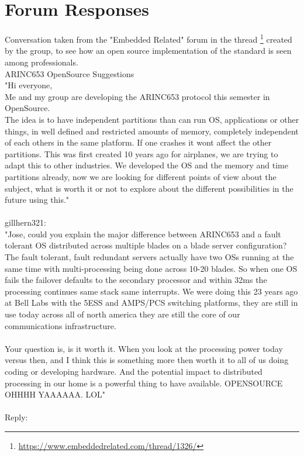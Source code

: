\chapter{Forum Responses}
\label{chap:Forum Responses}

Conversation taken from the "Embedded Related" forum in the thread
\footnote{\url{https://www.embeddedrelated.com/thread/1326/}}
created by the group, to see how an open source implementation of the \arinc{}
standard is seen among professionals.\\


ARINC653 OpenSource Suggestions\\

"Hi everyone,\\

Me and my group are developing the ARINC653 protocol this semester in OpenSource.\\
The idea is to have independent partitions than can run OS, applications or other things, in well defined
and restricted amounts of memory, completely independent of each others in the same platform. If one
crashes it won\textquotesingle t affect the other partitions. This was first created 10 years ago for airplanes, we are
trying to adapt this to other industries. We developed the OS and the memory and time partitions already,
now we are looking for different points of view about the subject, what is worth it or not to explore 
about the different possibilities in the future using this."\\
\\
gillhern321:\\

"Jose, could you explain the major difference between ARINC653 and a fault tolerant OS distributed across 
multiple blades on a blade server configuration? The fault tolerant, fault redundant servers actually have 
two OS\textquotesingle s running at the same time with multi-processing being done across 10-20 blades. So when one OS 
fails the failover defaults to the secondary processor and within 32ms the processing continues same stack 
same interrupts. We were doing this 23 years ago at Bell Labs with the 5ESS and AMPS/PCS switching 
platforms, they are still in use today across all of north america they are still the core of our 
communications infrastructure.\\
\\

Your question is, is it worth it. When you look at the processing power today versus then,  and I think 
this is something more then worth it to all of us doing coding or developing hardware. And the potential 
impact to distributed processing in our home is a powerful thing to have available.  OPENSOURCE     OHHHH 
YAAAAAA. LOL"\\
\\
Reply:\\

